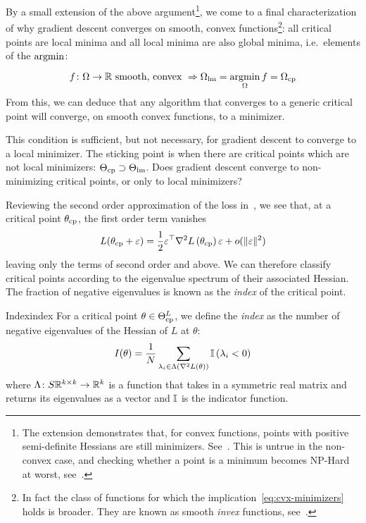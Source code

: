 \documentclass[../../thesis.tex]{subfiles}
\begin{document}
By a small extension of the above
argument\footnote{The extension demonstrates that,
for convex functions,
points with positive semi-definite Hessians
are still minimizers.
See~\cite{boyd2004}.
This is untrue in the non-convex case,
and checking whether a point is a minimum becomes NP-Hard at worst,
see~\cite{murty1987}.},
we come to a final characterization
of why gradient descent converges on smooth, convex
functions\footnote{In fact
the class of functions for which the implication~\ref{eq:cvx-minimizers}
holds is broader.
They are known as smooth \emph{invex} functions,
see~\cite{invex2008}.}:
all critical points are local minima
and all local minima are also global minima,
i.e.~elements of the $\mathop{\mathrm{argmin}}$:

\begin{equation}\equationlabel{cvx-minimizers}
	f\from\Omega\to\R \text{\ smooth, convex\ }
	\Rightarrow \Omega_{\lm} = \argmin_{\Omega} f = \Omega_{\cp}
\end{equation}
\noindent From this, we can deduce
that any algorithm that converges to a generic critical point will converge,
on smooth convex functions, to a minimizer.

This condition is sufficient, but not necessary,
for gradient descent to converge to a local minimizer.
The sticking point is when there are
critical points which are not local minimizers:
$\Theta_{\mathrm{cp}} \supset \Theta_{\mathrm{lm}}$.
Does gradient descent converge to non-minimizing critical points,
or only to local minimizers?

Reviewing the second order approximation of the loss
in~,
we see that, at a critical point $\theta_{\mathrm{cp}}$,
the first order term vanishes
\begin{equation}
	L(\theta_{\mathrm{cp}} + \varepsilon) = \frac{1}{2}\varepsilon^\top\nabla^2L\left(\theta_{\mathrm{cp}}\right)\varepsilon + o(\lVert\varepsilon\rVert^2)
\end{equation}
\noindent leaving only the terms of second order and above.
We can therefore classify critical points according to the
eigenvalue spectrum of their associated Hessian.
The fraction of negative eigenvalues is known as the
\emph{index} of the critical point.

\begin{definition}{Index}{index}
	For a critical point $\theta\in\Theta^L_{\mathrm{cp}}$,
	we define the \emph{index}
	as the number of negative eigenvalues
	of the Hessian of $L$ at $\theta$:
	\begin{equation}\equationlabel{def-index}
		I(\theta) = \frac{1}{N}
		\sum_{\lambda_i \in \Lambda\left(\hess{L}{\theta}\right)}%
		{\Ind\left(\lambda_i < 0\right)}
	\end{equation}
	where $\Lambda\colon S\mathbb{R}^{k\times k}\to\mathbb{R}^k$
	is a function that takes in a symmetric real matrix
	and returns its eigenvalues as a vector
	and $\mathbb{I}$ is the indicator function.
\end{definition}
\end{document}

